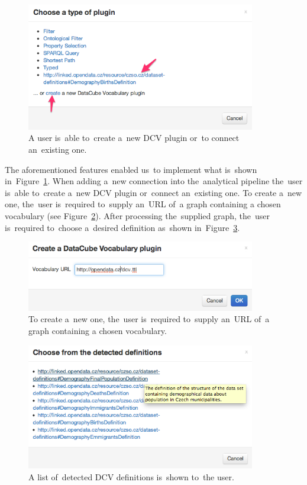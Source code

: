 \begin{figure}
	\centering
	\includegraphics[width=100mm]{img/choose-plugin.png}
	\caption{A user is~able to~create a~new DCV plugin or~to connect an~existing one.}
	\label{fig:choose-plugin}
\end{figure}

The aforementioned features enabled us~to implement what is~shown in~Figure~\ref{fig:choose-plugin}. When adding a~new connection into the~analytical 
pipeline the~user is~able to~create a~new DCV plugin or~connect an~existing one. 
To create a~new one, the~user is~required to~supply an~URL of~a graph containing 
a chosen vocabulary (see Figure~\ref{fig:create-plugin}). After processing the~supplied graph, the~user is~required to~choose a~desired definition as~shown in~Figure~\ref{fig:choose-def}.

\begin{figure}
	\centering
	\includegraphics[width=100mm]{img/create-dcv.png}
	\caption{To create a~new one, the~user is~required to~supply an~URL of~a graph containing 
a chosen vocabulary.}
	\label{fig:create-plugin}
\end{figure}


\begin{figure}
	\centering
	\includegraphics[width=100mm]{img/choose-def.png}
	\caption{A list of~detected DCV definitions is~shown to~the user.}
	\label{fig:choose-def}
\end{figure}

